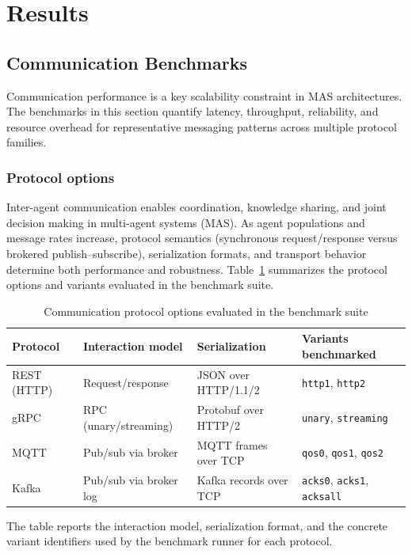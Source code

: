 \section{Results}


\subsection{Communication Benchmarks}


Communication performance is a key scalability constraint in MAS architectures. The benchmarks in this section quantify latency, throughput, reliability, and resource overhead for representative messaging patterns across multiple protocol families.


\subsubsection{Protocol options}
Inter-agent communication enables coordination, knowledge sharing, and joint decision making in multi-agent systems (MAS). As agent populations and message rates increase, protocol semantics (synchronous request/response versus brokered publish--subscribe), serialization formats, and transport behavior determine both performance and robustness. Table~\ref{tab:comm-protocol-options} summarizes the protocol options and variants evaluated in the benchmark suite.

\begin{table}[H]
\centering
\caption{Communication protocol options evaluated in the benchmark suite}
\label{tab:comm-protocol-options}
\begin{tabular}{l|l|l|l}
\toprule
\textbf{Protocol} & \textbf{Interaction model} & \textbf{Serialization} & \textbf{Variants benchmarked} \\
\midrule
REST (HTTP) & Request/response & JSON over HTTP/1.1/2 & \texttt{http1}, \texttt{http2} \\
gRPC & RPC (unary/streaming) & Protobuf over HTTP/2 & \texttt{unary}, \texttt{streaming} \\
MQTT & Pub/sub via broker & MQTT frames over TCP & \texttt{qos0}, \texttt{qos1}, \texttt{qos2} \\
Kafka & Pub/sub via broker log & Kafka records over TCP & \texttt{acks0}, \texttt{acks1}, \texttt{acksall} \\
\bottomrule
\end{tabular}
\end{table}

The table reports the interaction model, serialization format, and the concrete variant identifiers used by the benchmark runner for each protocol.

